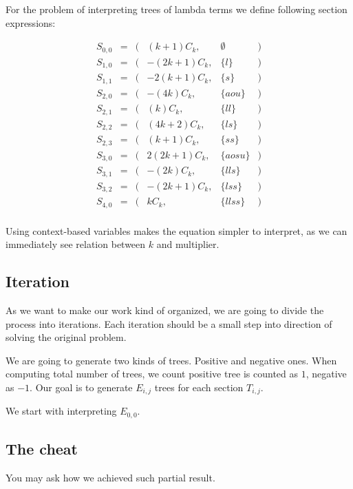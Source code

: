 \documentclass[final]{article}
\theoremstyle{definition}
\theoremstyle{remark}
\begin{document}
For the problem of interpreting trees of lambda terms we define following section expressions:

\[\begin{array}{rccrlc}
        S_{0,0} &=& (& (k + 1) C_k,& \emptyset &)\\
        S_{1,0} &=& (& - (2 k + 1) C_k,& \{l\} &)\\
        S_{1,1} &=& (& - 2 (k + 1) C_k,& \{s\} &)\\
        S_{2,0} &=& (& - (4 k) C_k,& \{aou\} &)\\
        S_{2,1} &=& (& (k) C_k,& \{ll\} &)\\
        S_{2,2} &=& (& (4 k + 2) C_k,& \{ls\} &)\\
        S_{2,3} &=& (& (k + 1) C_k,& \{ss\} &)\\
        S_{3,0} &=& (& 2 (2 k + 1) C_k,& \{aosu\} &)\\
        S_{3,1} &=& (& - (2 k) C_k,& \{lls\} &)\\
        S_{3,2} &=& (& - (2 k + 1) C_k,& \{lss\} &)\\
        S_{4,0} &=& (& k C_k,& \{llss\} &)\\
\end{array}\]

Using context-based variables makes the equation simpler to interpret, as we can immediately see relation between \(k\) and multiplier.

\subsection{Iteration}%
\label{sub:iteration}

As we want to make our work kind of organized, we are going to divide the process into iterations. Each iteration should be a small step into direction of solving the original problem.

We are going to generate two kinds of trees. Positive and negative ones. When computing total number of trees, we count positive tree is counted as \(1\), negative as \(-1\). Our goal is to generate \(E_{i, j}\) trees for each section \(T_{i, j}\).

We start with interpreting \(E_{0,0}\).

\subsection{The cheat}%
\label{sub:the_cheat}

You may ask how we achieved such partial result.
\end{document}

